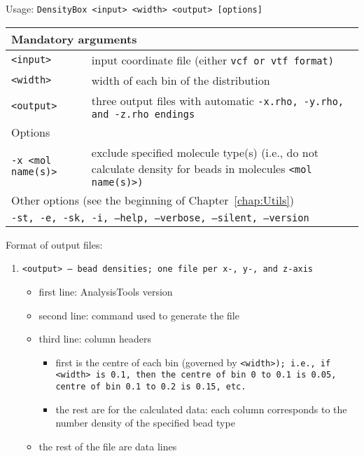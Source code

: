 \vspace{1em}
\noindent
Usage: \tt{DensityBox <input> <width> <output> [options]}
\noindent
\begin{longtable}{p{}p{}}
  \toprule
  \multicolumn{2}{l}{Mandatory arguments}\\
  \midrule
  \tt{<input>} & input coordinate file (either \tt{vcf} or \tt{vtf} format)\\
  \tt{<width>} & width of each bin of the distribution\\
  \tt{<output>} & three output files with automatic \tt{-x.rho}, \tt{-y.rho},
    and \tt{-z.rho} endings\\
  \toprule
  \multicolumn{2}{l}{Options}\\
  \midrule
  \tt{-x <mol name(s)>} & exclude specified molecule type(s) (i.e., do not
    calculate density for beads in molecules \tt{<mol name(s)>})\\
      \midrule
  \multicolumn{2}{l}{Other options (see the beginning of 
                     Chapter~\ref{chap:Utils})}\\
  \midrule
  \multicolumn{2}{l}{\tt{-st},
                     \tt{-e},
                     \tt{-sk},
                     \tt{-i},
                     \tt{--help},
                     \tt{--verbose},
                     \tt{--silent},
                     \tt{--version}}\\
  \bottomrule
\end{longtable}

\noindent
Format of output files:
\begin{enumerate}[nosep,leftmargin=20pt]
  \item \tt{<output>} -- bead densities; one file per x-, y-, and z-axis
    \begin{itemize}[nosep,leftmargin=5pt]
      \item first line: AnalysisTools version
      \item second line: command used to generate the file
      \item third line: column headers
        \begin{itemize}[nosep,leftmargin=5pt]
          \item first is the centre of each bin (governed by
            \tt{<width>}); i.e., if \tt{<width>} is 0.1,
            then the centre of bin 0 to 0.1 is 0.05, centre of bin 0.1 to
            0.2 is 0.15, etc.
          \item the rest are for the calculated data: each column
            corresponds to the number density of the specified bead type
        \end{itemize}
    \item the rest of the file are data lines
    \end{itemize}
\end{enumerate}
